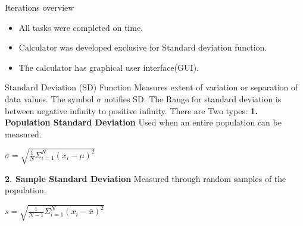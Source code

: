 \documentclass[final]{beamer}
\newlength{\onecolwid}
\begin{document}
\begin{frame}
\begin{columns}[t]
\begin{column}{\onecolwid}
\begin{exampleblock}{Iterations overview}

\begin{itemize}
\item All tasks were completed on time.
\item Calculator was developed exclusive for Standard deviation function.
\item The calculator has graphical user interface(GUI).
\end{itemize}

\end{exampleblock}


\begin{exampleblock}{Standard Deviation (SD) Function}
Measures extent of variation or separation of data values. The symbol $\sigma$ notifies SD. The Range for standard deviation is between negative infinity to positive infinity. There are Two types:\newline
\textbf{1. Population Standard Deviation}
\newline
Used when an entire population can be measured.
\begin{center}
\begin{math}
\sigma=\sqrt{\frac{1}{N}\Sigma_{i=1}^{N}(x_{i}-\mu)^2}
\end{math}
\end{center}
\newline
\textbf{2. Sample Standard Deviation}
\newline
Measured through random samples of the population. 
\begin{center}
\begin{math}
s= \sqrt{\frac{1}{N-1}\Sigma_{i=1}^{N}(x_{i}-\bar{x})^2}
\end{math}
\end{center}
\end{exampleblock}



\end{column}
\end{columns}
\end{frame}
\end{document}
